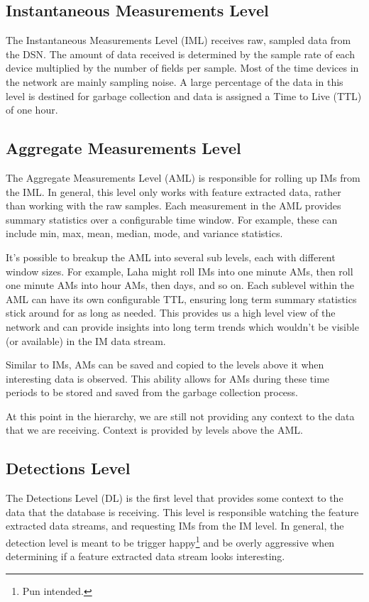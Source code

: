 \subsection{Instantaneous Measurements Level}
The Instantaneous Measurements Level (IML) receives raw, sampled data from the DSN. The amount of data received is determined by the sample rate of each device multiplied by the number of fields per sample. Most of the time devices in the network are mainly sampling noise. A large percentage of the data in this level is destined for garbage collection and data is assigned a Time to Live (TTL) of one hour. 

\subsection{Aggregate Measurements Level}
The Aggregate Measurements Level (AML) is responsible for rolling up IMs from the IML. In general, this level only works with feature extracted data, rather than working with the raw samples. Each measurement in the AML provides summary statistics over a configurable time window. For example, these can include min, max, mean, median, mode, and variance statistics. 

It's possible to breakup the AML into several sub levels, each with different window sizes. For example, Laha might roll IMs into one minute AMs, then roll one minute AMs into hour AMs, then days, and so on. Each sublevel within the AML can have its own configurable TTL, ensuring long term summary statistics stick around for as long as needed. This provides us a high level view of the network and can provide insights into long term trends which wouldn't be visible (or available) in the IM data stream.

Similar to IMs, AMs can be saved and copied to the levels above it when interesting data is observed. This ability allows for AMs during these time periods to be stored and saved from the garbage collection process.

At this point in the hierarchy, we are still not providing any context to the data that we are receiving. Context is provided by levels above the AML.

\subsection{Detections Level}
The Detections Level (DL) is the first level that provides some context to the data that the database is receiving. This level is responsible watching the feature extracted data streams, and requesting IMs from the IM level. In general, the detection level is meant to be trigger happy\footnote{Pun intended.} and be overly aggressive when determining if a feature extracted data stream looks interesting. 

